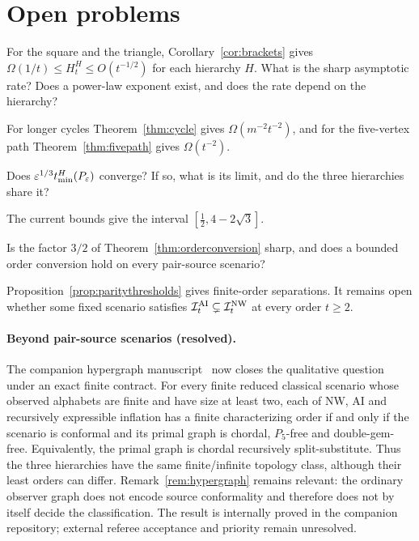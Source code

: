 \section{Open problems}\label{sec:open}

\begin{question}\label{q:hausdorff}
For the square and the triangle, Corollary~\ref{cor:brackets} gives $\Omega(1/t)\le H_t^H\le O(t^{-1/2})$ for each hierarchy $H$. What is the sharp asymptotic rate? Does a power-law exponent exist, and does the rate depend on the hierarchy?
\end{question}
For longer cycles Theorem~\ref{thm:cycle} gives $\Omega(m^{-2}t^{-2})$, and for the five-vertex path Theorem~\ref{thm:fivepath} gives $\Omega(t^{-2})$.

\begin{question}\label{q:constant}
Does $\varepsilon^{1/3}t_{\min}^H(P_\varepsilon)$ converge? If so, what is its limit, and do the three hierarchies share it?
\end{question}
The current bounds give the interval $[\tfrac12,4-2\sqrt3]$.

\begin{question}\label{q:separation}
Is the factor $3/2$ of Theorem~\ref{thm:orderconversion} sharp, and does a bounded order conversion hold on every pair-source scenario?
\end{question}
Proposition~\ref{prop:paritythresholds} gives finite-order separations. It remains open whether some fixed scenario satisfies $\mathcal I^{\mathrm{AI}}_t\subsetneq\mathcal I^{\mathrm{NW}}_t$ at every order $t\ge2$.

\paragraph{Beyond pair-source scenarios (resolved).}\label{q:hypergraph}
The companion hypergraph manuscript~\cite{BlairHypergraphTermination2026} now closes the qualitative question under
an exact finite contract.  For every finite reduced classical scenario whose
observed alphabets are finite and have size at least two, each of NW, AI and
recursively expressible inflation has a finite characterizing order if and
only if the scenario is conformal and its primal graph is chordal,
$P_5$-free and double-gem-free.  Equivalently, the primal graph is chordal
recursively split-substitute.  Thus the three hierarchies have the same
finite/infinite topology class, although their least orders can differ.
Remark~\ref{rem:hypergraph} remains relevant: the ordinary observer graph does
not encode source conformality and therefore does not by itself decide the
classification.  The result is internally proved in the companion repository;
external referee acceptance and priority remain unresolved.

